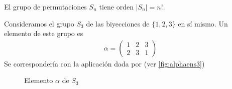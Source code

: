 \begin{obs}
	El grupo de permutaciones $S_n$ tiene orden $|S_n| = n!$.
\end{obs}

\begin{ej}
	Consideramos el grupo $S_3$ de las biyecciones de $\{1,2,3\}$ en sí mismo. Un elemento de este grupo es
	\begin{align*}
		\alpha = \left(\begin{array}{ccc}
		1 & 2 & 3 \\
		2 & 3 & 1
		\end{array}\right)
	\end{align*}
	Se correspondería con la aplicación dada por (ver \autoref{fig:alphaens3})
	\begin{figure}[h]
		\centering
		\caption{Elemento $\alpha$ de $S_3$}
		\label{fig:alphaens3}
	\end{figure}
\end{ej}

